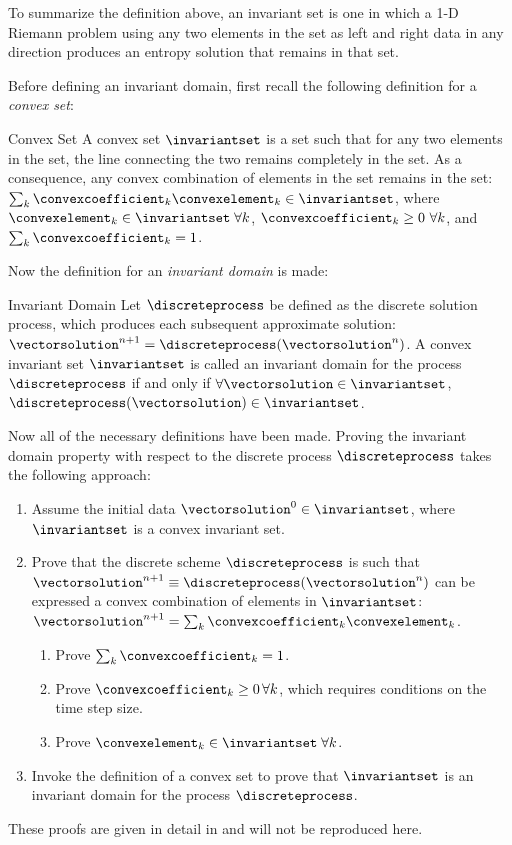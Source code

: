 To summarize the definition above, an invariant set is one in which
a 1-D Riemann problem using any two elements in the set as left and right
data in any direction produces an entropy solution that remains in that set.

Before defining an invariant domain, first recall the following definition
for a \emph{convex set}:
\begin{definition}{Convex Set}
A convex set $\invariantset$ is a set such that for any two elements in
the set, the line connecting the two remains completely in the set.
As a consequence, any convex combination of elements in the set remains in the
set: $\sum_k\convexcoefficient_k\convexelement_k\in\invariantset$, where
$\convexelement_k\in\invariantset\;\forall k$,
$\convexcoefficient_k\geq 0\,\,\forall k$, and $\sum_k\convexcoefficient_k=1$.
\end{definition}
Now the definition for an \emph{invariant domain} is made:
\begin{definition}{Invariant Domain}
Let $\discreteprocess$ be defined as the discrete solution process,
which produces each subsequent approximate solution:
$\vectorsolution^{n+1} = \discreteprocess(\vectorsolution^n)$.
A convex invariant set $\invariantset$ is called an invariant domain for the
process $\discreteprocess$ if and only if
$\forall\vectorsolution\in\invariantset$,
$\discreteprocess(\vectorsolution)\in\invariantset$.
\end{definition}
Now all of the necessary definitions have been made. Proving the invariant
domain property with respect to the discrete process $\discreteprocess$ takes
the following approach:
\begin{enumerate}
  \item Assume the initial data $\vectorsolution^0\in\invariantset$, where
    $\invariantset$ is a convex invariant set.
  \item Prove that the discrete scheme $\discreteprocess$ is such that
    $\vectorsolution^{n+1}\equiv\discreteprocess(\vectorsolution^n)$
    can be expressed a convex combination of elements in $\invariantset$:
    $\vectorsolution^{n+1}=\sum_k\convexcoefficient_k\convexelement_k$.
    \begin{enumerate}
      \item Prove $\sum_k\convexcoefficient_k=1$.
      \item Prove $\convexcoefficient_k\geq 0\,\forall k$, which requires
        conditions on the time step size.
      \item Prove $\convexelement_k\in\invariantset\;\forall k$.
    \end{enumerate}
  \item Invoke the definition of a convex set to prove that $\invariantset$
    is an invariant domain for the process $\discreteprocess$.
\end{enumerate}
These proofs are given in detail in \cite{guermond_invariantdomain} and
will not be reproduced here.

